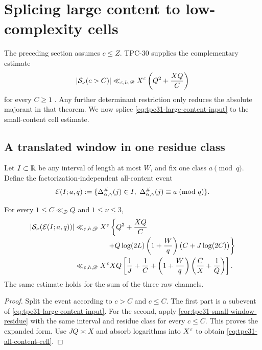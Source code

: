 \section{Splicing large content to low-complexity cells}
\label{sec:tpc31-all-content}

The preceding section assumes $c\le Z$.  TPC-30 supplies the
complementary estimate
\begin{equation}
 |\mathcal S_\nu(c>C)|
 \ll_{\varepsilon,h,\mathscr D}X^\varepsilon
 \left(Q^2+\frac{XQ}{C}\right)
 \label{eq:tpc31-large-content-input}
\end{equation}
for every $C\ge1$ \citep{WangTPC30}.  Any further determinant
restriction only reduces the absolute majorant in that theorem.  We
now splice \eqref{eq:tpc31-large-content-input} to the small-content
cell estimate.

\subsection{A translated window in one residue class}

Let $I\subset\mathbb R$ be any interval of length at most $W$, and fix one
class $a\pmod q$.  Define the factorization-independent all-content
event
\begin{equation}
 \mathcal E(I;a,q)
 :=\{\Delta^\#_{\alpha,\gamma}(j)\in I,
      \ \Delta^\#_{\alpha,\gamma}(j)\equiv a\!\pmod q\}.
 \label{eq:tpc31-all-content-cell-event}
\end{equation}

\begin{theorem}
\label{thm:tpc31-all-content-cell}
For every $1\le C\ll_{\mathscr D}Q$ and $1\le\nu\le3$,
\begin{align}
 |\mathcal S_\nu(\mathcal E(I;a,q))|
 \ll_{\varepsilon,h,\mathscr D}{}&X^\varepsilon
 \left\{
 Q^2+\frac{XQ}{C}
 \right.\notag\\[-0.2em]
 &\left.\quad
 +Q\log(2L)\left(1+\frac Wq\right)
 \bigl(C+J\log(2C)\bigr)
 \right\}
 \label{eq:tpc31-all-content-cell-expanded}\\
 \ll_{\varepsilon,h,\mathscr D}{}&X^\varepsilon XQ
 \left[
 \frac1J+\frac1C
 +\left(1+\frac Wq\right)
 \left(\frac CX+\frac1Q\right)
 \right].
 \label{eq:tpc31-all-content-cell}
\end{align}
The same estimate holds for the sum of the three raw channels.
\end{theorem}

\begin{proof}
Split the event according to $c>C$ and $c\le C$.  The first part is a
subevent of \eqref{eq:tpc31-large-content-input}.  For the second,
apply \cref{cor:tpc31-small-window-residue} with the same interval and
residue class for every $c\le C$.  This proves the expanded form.
Use $JQ\asymp X$ and absorb logarithms into $X^\varepsilon$ to obtain
\eqref{eq:tpc31-all-content-cell}.
\end{proof}

